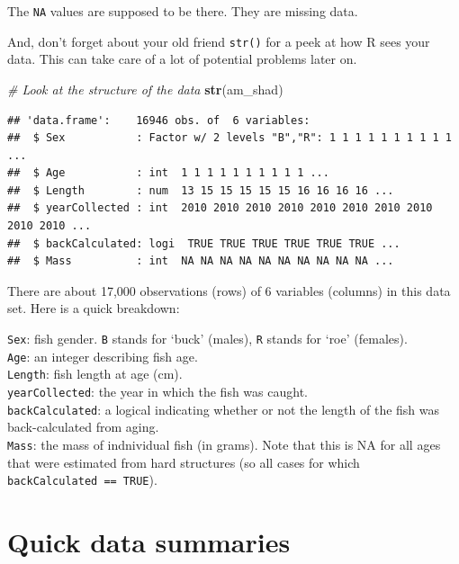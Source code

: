 \documentclass[
]{book}
\newenvironment{Shaded}{\begin{snugshade}}{\end{snugshade}}
\newcommand{\CommentTok}[1]{\textcolor[rgb]{0.56,0.35,0.01}{\textit{#1}}}
\newcommand{\KeywordTok}[1]{\textcolor[rgb]{0.13,0.29,0.53}{\textbf{#1}}}
\newcommand{\NormalTok}[1]{#1}
\begin{document}
The \texttt{NA} values are supposed to be there. They are missing data.

And, don't forget about your old friend \texttt{str()} for a peek at how R sees your data. This can take care of a lot of potential problems later on.

\begin{Shaded}
\begin{Highlighting}[]
\CommentTok{# Look at the structure of the data}
\KeywordTok{str}\NormalTok{(am_shad)}
\end{Highlighting}
\end{Shaded}

\begin{verbatim}
## 'data.frame':	16946 obs. of  6 variables:
##  $ Sex           : Factor w/ 2 levels "B","R": 1 1 1 1 1 1 1 1 1 1 ...
##  $ Age           : int  1 1 1 1 1 1 1 1 1 1 ...
##  $ Length        : num  13 15 15 15 15 15 16 16 16 16 ...
##  $ yearCollected : int  2010 2010 2010 2010 2010 2010 2010 2010 2010 2010 ...
##  $ backCalculated: logi  TRUE TRUE TRUE TRUE TRUE TRUE ...
##  $ Mass          : int  NA NA NA NA NA NA NA NA NA NA ...
\end{verbatim}

There are about 17,000 observations (rows) of 6 variables (columns) in this data set. Here is a quick breakdown:

\texttt{Sex}: fish gender. \texttt{B} stands for `buck' (males), \texttt{R} stands for `roe' (females).\\

\texttt{Age}: an integer describing fish age.\\

\texttt{Length}: fish length at age (cm).\\

\texttt{yearCollected}: the year in which the fish was caught.\\

\texttt{backCalculated}: a logical indicating whether or not the length
of the fish was back-calculated from aging.\\

\texttt{Mass}: the mass of indnividual fish (in grams). Note that this is NA
for all ages that were estimated from hard structures (so all
cases for which \texttt{backCalculated\ ==\ TRUE}).

\hypertarget{quick-data-summaries}{%
\section{Quick data summaries}\label{quick-data-summaries}}
\end{document}
